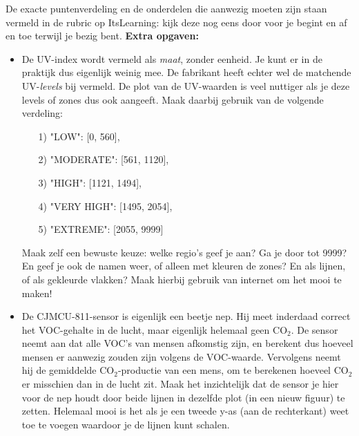 \documentclass[a4paper,11pt, fleqn]{article}
\begin{document}
De exacte puntenverdeling en de onderdelen die aanwezig moeten zijn staan vermeld in de rubric op ItsLearning: kijk deze nog eens door voor je begint en af en toe terwijl je bezig bent.
\bigbreak
{\bf Extra opgaven:}
\begin{itemize}
	\item De UV-index wordt vermeld als {\it maat}, zonder eenheid. Je kunt er in de praktijk dus eigenlijk weinig mee. De fabrikant heeft echter wel de matchende UV-{\it levels} bij vermeld. De plot van de UV-waarden is veel nuttiger als je deze levels of zones dus ook aangeeft. Maak daarbij gebruik van de volgende verdeling:
	\begin{itemize}
		\item[1)] "LOW": [0, 560],
		\item[2)] "MODERATE": [561, 1120],
		\item[3)] "HIGH": [1121, 1494],
		\item[4)] "VERY HIGH": [1495, 2054],
		\item[5)] "EXTREME": [2055, 9999] 
	\end{itemize}
	Maak zelf een bewuste keuze: welke regio's geef je aan? Ga je door tot 9999? En geef je ook de namen weer, of alleen met kleuren de zones? En als lijnen, of als gekleurde vlakken? Maak hierbij gebruik van internet om het mooi te maken!
	\item De CJMCU-811-sensor is eigenlijk een beetje nep. Hij meet inderdaad correct het VOC-gehalte in de lucht, maar eigenlijk helemaal geen CO$_2$. De sensor neemt aan dat alle VOC's van mensen afkomstig zijn, en berekent dus hoeveel mensen er aanwezig zouden zijn volgens de VOC-waarde. Vervolgens neemt hij de gemiddelde CO$_2$-productie van een mens, om te berekenen hoeveel CO$_2$ er misschien dan in de lucht zit. Maak het inzichtelijk dat de sensor je hier voor de nep houdt door beide lijnen in dezelfde plot (in een nieuw figuur) te zetten. Helemaal mooi is het als je een tweede y-as (aan de rechterkant) weet toe te voegen waardoor je de lijnen kunt schalen.
\end{itemize}
\end{document}
